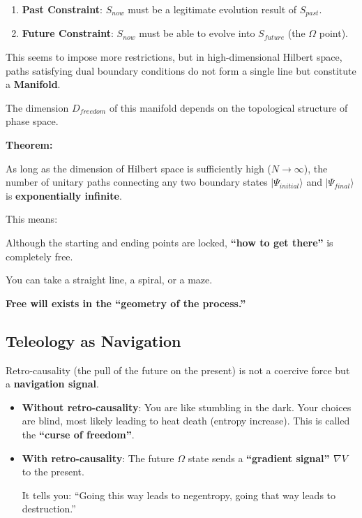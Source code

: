 \begin{enumerate}
\item \textbf{Past Constraint}: $S_{now}$ must be a legitimate evolution result of $S_{past}$.

\item \textbf{Future Constraint}: $S_{now}$ must be able to evolve into $S_{future}$ (the $\Omega$ point).
\end{enumerate}

This seems to impose more restrictions, but in high-dimensional Hilbert space, paths satisfying dual boundary conditions do not form a single line but constitute a \textbf{Manifold}.

The dimension $D_{freedom}$ of this manifold depends on the topological structure of phase space.

\textbf{Theorem:}

As long as the dimension of Hilbert space is sufficiently high ($N \to \infty$), the number of unitary paths connecting any two boundary states $|\Psi_{initial}\rangle$ and $|\Psi_{final}\rangle$ is \textbf{exponentially infinite}.

This means:

Although the starting and ending points are locked, \textbf{``how to get there''} is completely free.

You can take a straight line, a spiral, or a maze.

\textbf{Free will exists in the ``geometry of the process.''}

\subsection{Teleology as Navigation}

Retro-causality (the pull of the future on the present) is not a coercive force but a \textbf{navigation signal}.

\begin{itemize}
\item \textbf{Without retro-causality}: You are like stumbling in the dark. Your choices are blind, most likely leading to heat death (entropy increase). This is called the \textbf{``curse of freedom''}.

\item \textbf{With retro-causality}: The future $\Omega$ state sends a \textbf{``gradient signal'' $\nabla V$} to the present.

It tells you: ``Going this way leads to negentropy, going that way leads to destruction.''
\end{itemize}

